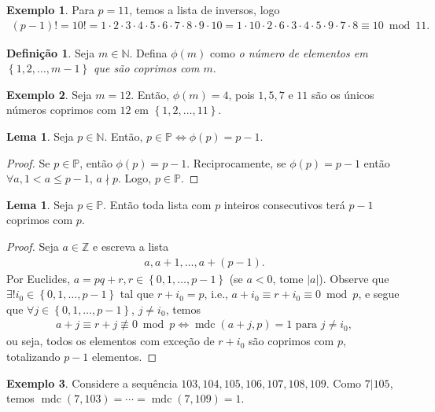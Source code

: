 \documentclass[a4paper,11pt,twoside, leqno]{article}
\DeclareMathOperator{\mdc}{mdc}
\theoremstyle{definition}
\newtheorem*{definition}{Definição}
\newtheorem{lemma}[theorem]{Lema}
\newtheorem*{example}{Exemplo}
\begin{document}
\begin{example}
	Para $p=11$, temos a lista de inversos, logo 
	\begin{align*}
	(p-1)! = 10! = 1\cdot 2\cdot 3\cdot 4\cdot 5\cdot 6\cdot 7\cdot 8\cdot 9\cdot 10 = 1\cdot 10\cdot 2\cdot 6\cdot 3\cdot 4\cdot 5\cdot 9\cdot 7\cdot 8 \equiv 10\bmod 11.
	\end{align*}
\end{example}
\begin{definition}
	\label{funcao de euler}
	Seja $m\in\mathbb{N}$. Defina $\phi(m)$ como {\em o número de elementos em $\left\{1,2,\dots,m-1\right\}$ que são coprimos com $m$}.
\end{definition}
\begin{example}
	Seja $m=12$. Então, $\phi(m) = 4$, pois $1,5,7$ e $11$ são os únicos números coprimos com $12$ em $\left\{1, 2, \dots, 11\right\}$.
\end{example}
\begin{lemma}
	\label{lema 47}
	Seja $p\in\mathbb{N}$. Então, $p\in\mathbb{P}\Leftrightarrow \phi(p) = p-1$. 
\end{lemma}
\begin{proof}
	Se $p\in\mathbb{P}$, então $\phi(p) = p-1$. Reciprocamente, se $\phi(p) = p-1$ então $\forall a, 1 < a\leq p-1$, $a\nmid p$. Logo, $p\in\mathbb{P}$.
\end{proof}
\begin{lemma}
	\label{lema 48}
	Seja $p\in\mathbb{P}$. Então toda lista com $p$ inteiros consecutivos terá $p-1$ coprimos com $p$.
\end{lemma}
\begin{proof}
	Seja $a\in\mathbb{Z}$ e escreva a lista
	\begin{align*}
	a, a+1, \dots, a+(p-1).
	\end{align*}
	Por Euclides, $a=pq+r, r\in\left\{ 0,1,\dots,p-1 \right\}$ (se $a<0$, tome $|a|$). Observe que $\exists!i_0\in\left\{ 0,1,\dots,p-1 \right\}$ tal que $r + i_0 = p$, i.e., $a+i_0\equiv r+i_0\equiv 0\bmod p$, e segue que $\forall j\in\left\{ 0,1,\dots,p-1 \right\}$, $j\neq i_0$, temos
	\begin{align*}
	a+j\equiv r+j \not\equiv 0\bmod p \Leftrightarrow \mdc(a+j,p) = 1 \text{ para } j\neq i_0,
	\end{align*}
	ou seja, todos os elementos com exceção de $r+i_0$ são coprimos com $p$, totalizando $p-1$ elementos.
\end{proof}
\begin{example}
	Considere a sequência $103,104,105,106,107,108,109$. Como $7|105$, temos $\mdc(7,103) = \cdots = \mdc(7,109) = 1$.
\end{example}
\end{document}
